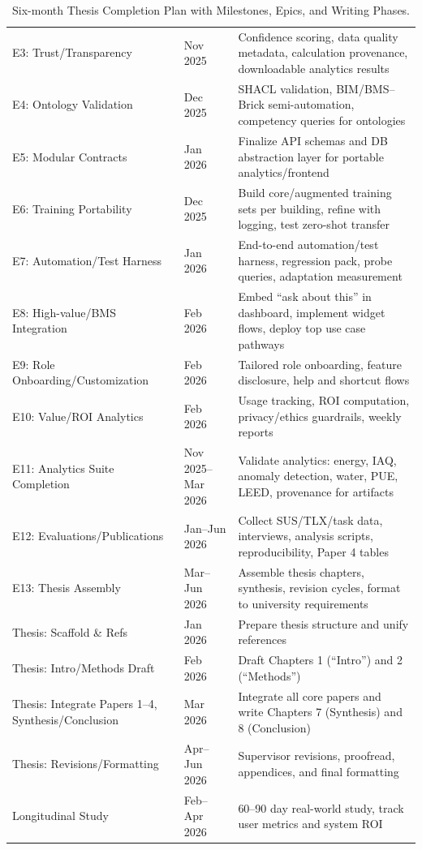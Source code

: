 \documentclass[acmlarge]{acmart}
\begin{document}
\begin{table}[ht]
\begin{tabular}{p{5cm} p{2cm} p{7cm}}
E3: Trust/Transparency & Nov 2025 & Confidence scoring, data quality metadata, calculation provenance, downloadable analytics results \\
E4: Ontology Validation & Dec 2025 & SHACL validation, BIM/BMS–Brick semi-automation, competency queries for ontologies \\
E5: Modular Contracts & Jan 2026 & Finalize API schemas and DB abstraction layer for portable analytics/frontend \\
E6: Training Portability & Dec 2025 & Build core/augmented training sets per building, refine with logging, test zero-shot transfer \\
E7: Automation/Test Harness & Jan 2026 & End-to-end automation/test harness, regression pack, probe queries, adaptation measurement \\
E8: High-value/BMS Integration & Feb 2026 & Embed “ask about this” in dashboard, implement widget flows, deploy top use case pathways \\
E9: Role Onboarding/Customization & Feb 2026 & Tailored role onboarding, feature disclosure, help and shortcut flows \\
E10: Value/ROI Analytics & Feb 2026 & Usage tracking, ROI computation, privacy/ethics guardrails, weekly reports \\
E11: Analytics Suite Completion & Nov 2025--Mar 2026 & Validate analytics: energy, IAQ, anomaly detection, water, PUE, LEED, provenance for artifacts \\
E12: Evaluations/Publications & Jan--Jun 2026 & Collect SUS/TLX/task data, interviews, analysis scripts, reproducibility, Paper 4 tables \\
E13: Thesis Assembly & Mar--Jun 2026 & Assemble thesis chapters, synthesis, revision cycles, format to university requirements \\
Thesis: Scaffold \& Refs & Jan 2026 & Prepare thesis structure and unify references \\
Thesis: Intro/Methods Draft & Feb 2026 & Draft Chapters 1 (“Intro”) and 2 (“Methods”) \\
Thesis: Integrate Papers 1--4, Synthesis/Conclusion & Mar 2026 & Integrate all core papers and write Chapters 7 (Synthesis) and 8 (Conclusion) \\
Thesis: Revisions/Formatting & Apr--Jun 2026 & Supervisor revisions, proofread, appendices, and final formatting \\
Longitudinal Study & Feb--Apr 2026 & 60--90 day real-world study, track user metrics and system ROI \\
\bottomrule
\end{tabular}
\caption{Six-month Thesis Completion Plan with Milestones, Epics, and Writing Phases.}
\label{tab:thesis-gantt-plan}
\end{table}




\appendix
\end{document}
